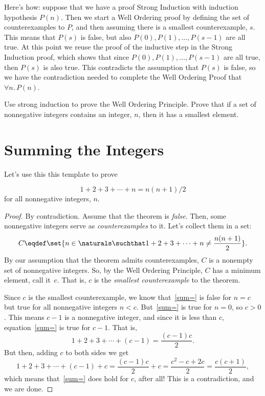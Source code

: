 Here's how: suppose that we have a proof Strong Induction with induction
hypothesis $P(n)$.  Then we start a Well Ordering proof by defining the
set of counterexamples to $P$, and then assuming there is a smallest
counterexample, $s$.  This means that $P(s)$ is false, but also $P(0),
P(1),\dots, P(s-1)$ are all true.  At this point we reuse the proof of the
inductive step in the Strong Induction proof, which shows that since
$P(0), P(1),\dots, P(s-1)$ are all true, then $P(s)$ is also true.  This
contradicts the assumption that $P(s)$ is false, so we have the
contradiction needed to complete the Well Ordering Proof that $\forall
n.\, P(n)$.

\begin{notesproblem}
Use strong induction to prove the Well Ordering Principle. \hint Prove
that if a set of nonnegative integers contains an integer, $n$, then it
has a smallest element.
\end{notesproblem}
\fi

\begin{problems}
\classproblems
{}
\homeworkproblems
{}
\end{problems}

\section{Summing the Integers}
 Let's use this this template to prove %

\begin{theorem*}\label{sum-to-n}
\begin{equation}\label{sum=}
1 + 2 + 3 + \cdots + n = n(n+1)/2
\end{equation}
for all nonnegative integers, $n$.
\end{theorem*}

\begin{proof}
By contradiction.  Assume that the theorem is
\emph{false}.  Then, some nonnegative integers serve as
\emph{counterexamples} to it. Let's collect them in a set: 
\[
C \eqdef \set{n\in\naturals \suchthat 
        1 + 2 + 3 + \cdots + n \neq \frac{n(n+1)}{2}}.
\]
By our assumption that the theorem admits counterexamples, $C$ is a
nonempty set of nonnegative integers.  So, by the Well Ordering Principle,
$C$ has a minimum element, call it~$c$.  That is, $c$ is the
\emph{smallest counterexample} to the theorem.

Since $c$ is the smallest counterexample, we know that~\eqref{sum=} is
false for $n=c$ but true for all nonnegative integers $n<c$.
But~\eqref{sum=} is true for $n=0$, so $c > 0$.  This means $c-1$ is a
nonnegative integer, and since it is less than $c$, equation~\eqref{sum=}
is true for $c-1$.  That is,
\[
        1 + 2 + 3 + \cdots + (c-1) = \frac{(c-1)c}{2}.
\]
But then, adding $c$ to both sides we get
\[
1 + 2 + 3 + \cdots + (c-1) + c 
        = \frac{(c-1)c}{2} + c
        = \frac{c^2 - c + 2c}{2} 
        = \frac{c(c+1)}{2},
\]
which means that~\eqref{sum=} does hold for $c$, after all!  This is a
contradiction, and we are done.
\end{proof}

